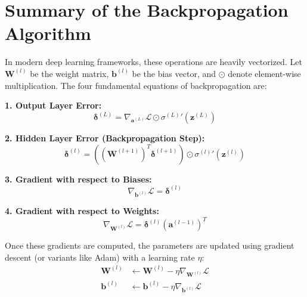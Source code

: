 \documentclass[11pt,a4paper]{article}
\begin{document}
\section{Summary of the Backpropagation Algorithm}

In modern deep learning frameworks, these operations are heavily vectorized. Let $\mathbf{W}^{(l)}$ be the weight matrix, $\mathbf{b}^{(l)}$ be the bias vector, and $\odot$ denote element-wise multiplication. The four fundamental equations of backpropagation are:

\vspace{0.5cm}
\noindent\textbf{1. Output Layer Error:}
\begin{equation}
	\mathbf{\delta}^{(L)} = \nabla_{\mathbf{a}^{(L)}} \mathcal{L} \odot {\sigma^{(L)}}'(\mathbf{z}^{(L)})
\end{equation}

\noindent\textbf{2. Hidden Layer Error (Backpropagation Step):}
\begin{equation}
	\mathbf{\delta}^{(l)} = \left( (\mathbf{W}^{(l+1)})^T \mathbf{\delta}^{(l+1)} \right) \odot {\sigma^{(l)}}'(\mathbf{z}^{(l)})
\end{equation}

\noindent\textbf{3. Gradient with respect to Biases:}
\begin{equation}
	\nabla_{\mathbf{b}^{(l)}} \mathcal{L} = \mathbf{\delta}^{(l)}
\end{equation}

\noindent\textbf{4. Gradient with respect to Weights:}
\begin{equation}
	\nabla_{\mathbf{W}^{(l)}} \mathcal{L} = \mathbf{\delta}^{(l)} (\mathbf{a}^{(l-1)})^T
\end{equation}
\vspace{0.5cm}

Once these gradients are computed, the parameters are updated using gradient descent (or variants like Adam) with a learning rate $\eta$:
\begin{align}
	\mathbf{W}^{(l)} &\leftarrow \mathbf{W}^{(l)} - \eta \nabla_{\mathbf{W}^{(l)}} \mathcal{L} \\
	\mathbf{b}^{(l)} &\leftarrow \mathbf{b}^{(l)} - \eta \nabla_{\mathbf{b}^{(l)}} \mathcal{L}
\end{align}
\end{document}
